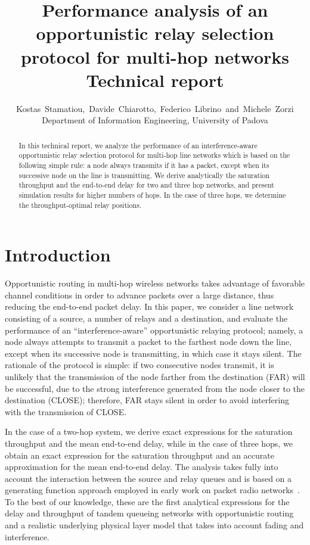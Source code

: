 \documentclass[draftclsnofoot,10pt,onecolumn,letterpaper]{IEEEtran}
\begin{document}
\title{Performance analysis of an opportunistic relay selection protocol for multi-hop networks \\ {\huge Technical report}
}

\author{Kostas~Stamatiou,~Davide~Chiarotto,~Federico~Librino~and~Michele~Zorzi \\ Department of Information Engineering, University of Padova}

\maketitle

\begin{abstract}
In this technical report, we analyze the performance of an interference-aware opportunistic relay selection protocol for multi-hop line networks which is based 
on the following simple rule: a node always transmits if it has a packet, except when its successive node on the line is transmitting.
We derive analytically the saturation throughput and the end-to-end delay for two and three hop networks, and present simulation results for higher 
numbers of hops. In the case of three hops, we determine the throughput-optimal relay positions.
\end{abstract}



\section{Introduction}
\label{Sec:intro}

Opportunistic routing in multi-hop wireless networks takes advantage of favorable channel conditions in order 
to advance packets over a large distance, thus reducing the end-to-end packet delay. 
In this paper, we consider a  line network consisting of a source, a number of relays and a destination, and
evaluate the performance of an ``interference-aware'' opportunistic relaying protocol; namely, a node always attempts to transmit a packet to the farthest node down the line, except when its successive node is transmitting, in which case it stays silent.
The rationale of the protocol is simple: if two consecutive nodes transmit, it is unlikely that the transmission of the node farther from the destination (FAR) will be successful, due to the strong interference generated from the node closer to the destination (CLOSE); therefore, FAR stays silent in order to avoid interfering with the transmission of CLOSE. 

In the case of a two-hop system, we derive exact expressions for the saturation throughput and the mean end-to-end delay, while
in the case of three hops, we obtain an exact expression for the saturation throughput and an accurate approximation for the 
mean end-to-end delay. The analysis takes fully into account the interaction between the source and relay queues and is based on a generating function approach employed in early work on packet radio networks~\cite{Sidi83}. To the best of our knowledge, these are the first analytical expressions for the delay and throughput of tandem queueing networks with opportunistic routing and a realistic underlying physical layer model that takes into account fading and interference. 
\end{document}
